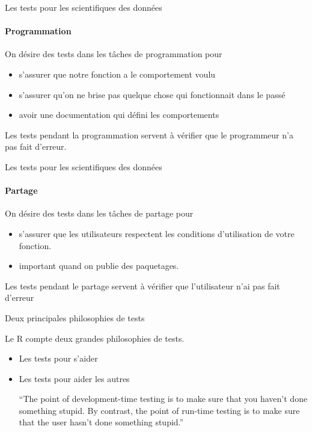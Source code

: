 \documentclass[11pt]{beamer}
\begin{document}
\begin{frame}{Les tests pour les scientifiques des données}
\framesubtitle{Programmation}
On désire des tests dans les tâches de programmation pour
\begin{itemize}
\item s'assurer que notre fonction a le comportement voulu
\item s'assurer qu'on ne brise pas quelque chose qui fonctionnait dans le passé
\item avoir une documentation qui défini les comportements
\end{itemize}
Les tests pendant la programmation servent à vérifier que le programmeur n'a pas fait d'erreur.
\end{frame}

\begin{frame}{Les tests pour les scientifiques des données}
\framesubtitle{Partage}
On désire des tests dans les tâches de partage pour
\begin{itemize}
\item s'assurer que les utilisateurs respectent les conditions d'utilisation de votre fonction.
\item important quand on publie des paquetages.
\end{itemize}
Les tests pendant le partage servent à vérifier que l'utilisateur n'ai pas fait d'erreur
\end{frame}

\begin{frame}{Deux principales philosophies de tests}

Le \textsf{R} compte deux grandes philosophies de tests.

\begin{itemize}
\item Les tests pour s'aider
\item Les tests pour aider les autres
\begin{block}{}
{\large ``The point of development-time testing is to make sure that you
haven’t done something stupid. By contrast, the point of run-time
testing is to make sure that the user hasn’t done something stupid.''}
\vskip5mm
\hspace*{}
\end{block}

\end{itemize}
\end{frame}
\end{document}
